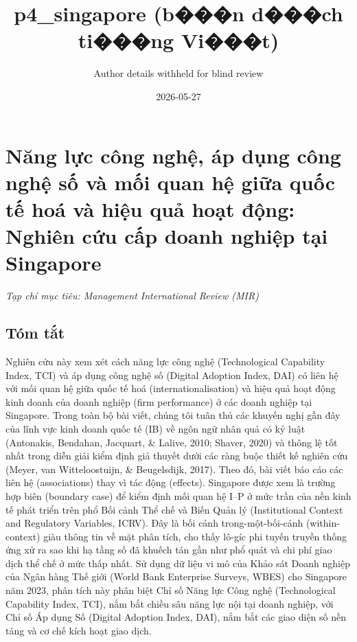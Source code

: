 \documentclass[12pt,a4paper]{article}
\title{p4\_singapore (b���n d���ch ti���ng Vi���t)}
\author{Author details withheld for blind review}
\date{2026-05-27}
\begin{document}
\maketitle

\hypertarget{nux103ng-lux1ef1c-cuxf4ng-nghux1ec7-uxe1p-dux1ee5ng-cuxf4ng-nghux1ec7-sux1ed1-vuxe0-mux1ed1i-quan-hux1ec7-giux1eefa-quux1ed1c-tux1ebf-houxe1-vuxe0-hiux1ec7u-quux1ea3-houx1ea1t-ux111ux1ed9ng-nghiuxean-cux1ee9u-cux1ea5p-doanh-nghiux1ec7p-tux1ea1i-singapore}{%
\section{Năng lực công nghệ, áp dụng công nghệ số và mối quan hệ giữa
quốc tế hoá và hiệu quả hoạt động: Nghiên cứu cấp doanh nghiệp tại
Singapore}\label{nux103ng-lux1ef1c-cuxf4ng-nghux1ec7-uxe1p-dux1ee5ng-cuxf4ng-nghux1ec7-sux1ed1-vuxe0-mux1ed1i-quan-hux1ec7-giux1eefa-quux1ed1c-tux1ebf-houxe1-vuxe0-hiux1ec7u-quux1ea3-houx1ea1t-ux111ux1ed9ng-nghiuxean-cux1ee9u-cux1ea5p-doanh-nghiux1ec7p-tux1ea1i-singapore}}

\emph{Tạp chí mục tiêu: Management International Review (MIR)}

\hypertarget{tuxf3m-tux1eaft}{%
\subsection{Tóm tắt}\label{tuxf3m-tux1eaft}}

Nghiên cứu này xem xét cách năng lực công nghệ (Technological Capability
Index, TCI) và áp dụng công nghệ số (Digital Adoption Index, DAI) có
liên hệ với mối quan hệ giữa quốc tế hoá (internationalisation) và hiệu
quả hoạt động kinh doanh của doanh nghiệp (firm performance) ở các doanh
nghiệp tại Singapore. Trong toàn bộ bài viết, chúng tôi tuân thủ các
khuyến nghị gần đây của lĩnh vực kinh doanh quốc tế (IB) về ngôn ngữ
nhân quả có kỷ luật (Antonakis, Bendahan, Jacquart, \& Lalive, 2010;
Shaver, 2020) và thông lệ tốt nhất trong diễn giải kiểm định giả thuyết
dưới các ràng buộc thiết kế nghiên cứu (Meyer, van Witteloostuijn, \&
Beugelsdijk, 2017). Theo đó, bài viết báo cáo các liên hệ (associations)
thay vì tác động (effects). Singapore được xem là trường hợp biên
(boundary case) để kiểm định mối quan hệ I--P ở mức trần của nền kinh tế
phát triển trên phổ Bối cảnh Thể chế và Biến Quản lý (Institutional
Context and Regulatory Variables, ICRV). Đây là bối cảnh
trong-một-bối-cảnh (within-context) giàu thông tin về mặt phân tích, cho
thấy lô-gíc phi tuyến truyền thống ứng xử ra sao khi hạ tầng số đã
khuếch tán gần như phổ quát và chi phí giao dịch thể chế ở mức thấp
nhất. Sử dụng dữ liệu vi mô của Khảo sát Doanh nghiệp của Ngân hàng Thế
giới (World Bank Enterprise Surveys, WBES) cho Singapore năm 2023, phân
tích này phân biệt Chỉ số Năng lực Công nghệ (Technological Capability
Index, TCI), nắm bắt chiều sâu năng lực nội tại doanh nghiệp, với Chỉ số
Áp dụng Số (Digital Adoption Index, DAI), nắm bắt các giao diện số nền
tảng và cơ chế kích hoạt giao dịch.
\end{document}
